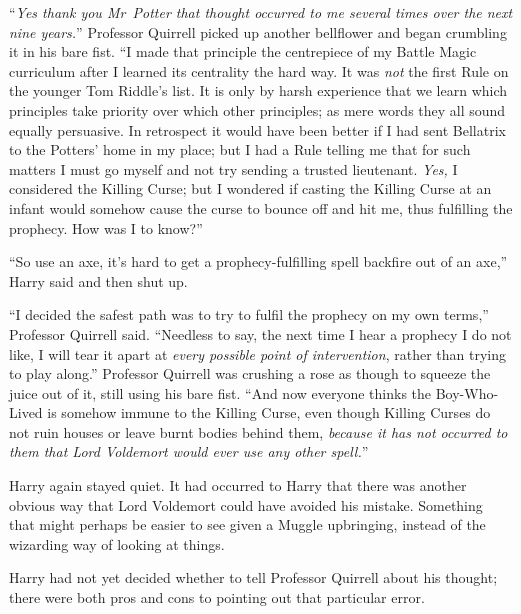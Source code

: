 “\emph{Yes thank you Mr~Potter that thought occurred to me several times over the next nine years.}” Professor Quirrell picked up another bellflower and began crumbling it in his bare fist. “I made that principle the centrepiece of my Battle Magic curriculum after I learned its centrality the hard way. It was \emph{not} the first Rule on the younger Tom Riddle’s list. It is only by harsh experience that we learn which principles take priority over which other principles; as mere words they all sound equally persuasive. In retrospect it would have been better if I had sent Bellatrix to the Potters’ home in my place; but I had a Rule telling me that for such matters I must go myself and not try sending a trusted lieutenant. \emph{Yes,} I considered the Killing Curse; but I wondered if casting the Killing Curse at an infant would somehow cause the curse to bounce off and hit me, thus fulfilling the prophecy. How was I to know?”

“So use an axe, it’s hard to get a prophecy-fulfilling spell backfire out of an axe,” Harry said and then shut up.

“I decided the safest path was to try to fulfil the prophecy on my own terms,” Professor Quirrell said. “Needless to say, the next time I hear a prophecy I do not like, I will tear it apart at \emph{every possible point of intervention}, rather than trying to play along.” Professor Quirrell was crushing a rose as though to squeeze the juice out of it, still using his bare fist. “And now everyone thinks the Boy-Who-Lived is somehow immune to the Killing Curse, even though Killing Curses do not ruin houses or leave burnt bodies behind them, \emph{because it has not occurred to them that Lord Voldemort would ever use any other spell.}”

Harry again stayed quiet. It had occurred to Harry that there was another obvious way that Lord Voldemort could have avoided his mistake. Something that might perhaps be easier to see given a Muggle upbringing, instead of the wizarding way of looking at things.

Harry had not yet decided whether to tell Professor Quirrell about his thought; there were both pros and cons to pointing out that particular error.

